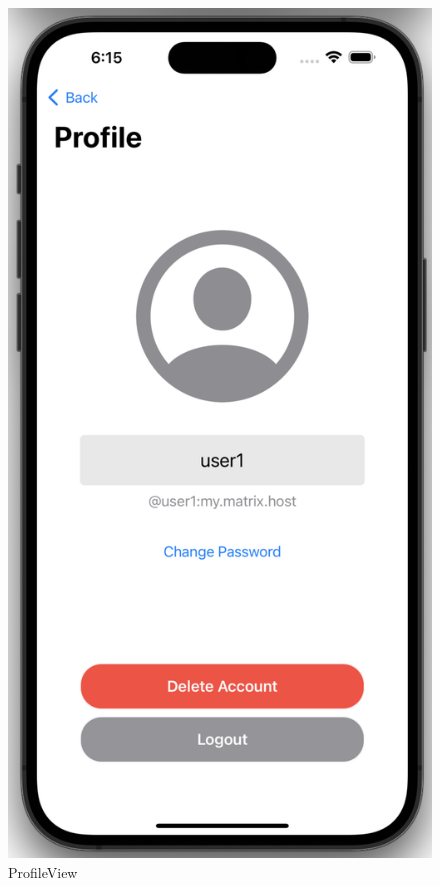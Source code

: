     \begin{figure}[h]
        \includegraphics[scale=0.5]{profile}
        \centering
        \caption{ProfileView}\label{fig:profileview}
    \end{figure}

